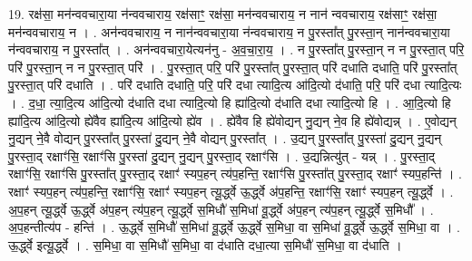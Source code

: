 \documentclass[17pt]{extarticle}
\begin{document}
19. रक्ष॑सा॒ मन॑न्ववचारा॒या न॑न्ववचाराय॒ रक्ष॑साꣳ॒॒ रक्ष॑सा॒ मन॑न्ववचाराय॒ न नान॑ न्ववचाराय॒ रक्ष॑साꣳ॒॒ रक्ष॑सा॒ मन॑न्ववचाराय॒ न । . अन॑न्ववचाराय॒ न नान॑न्ववचारा॒या न॑न्ववचाराय॒ न पु॒रस्ता᳚त् पु॒रस्ता॒न् नान॑न्ववचारा॒या न॑न्ववचाराय॒ न पु॒रस्ता᳚त् । . अन॑न्ववचारा॒येत्यन॑नु - अ॒व॒चा॒रा॒य॒ । . न पु॒रस्ता᳚त् पु॒रस्ता॒न् न न पु॒रस्ता॒त् परि॒ परि॑ पु॒रस्ता॒न् न न पु॒रस्ता॒त् परि॑ । . पु॒रस्ता॒त् परि॒ परि॑ पु॒रस्ता᳚त् पु॒रस्ता॒त् परि॑ दधाति दधाति॒ परि॑ पु॒रस्ता᳚त् पु॒रस्ता॒त् परि॑ दधाति । . परि॑ दधाति दधाति॒ परि॒ परि॑ दधा त्यादि॒त्य आ॑दि॒त्यो द॑धाति॒ परि॒ परि॑ दधा त्यादि॒त्यः । . द॒धा॒ त्या॒दि॒त्य आ॑दि॒त्यो द॑धाति दधा त्यादि॒त्यो हि ह्या॑दि॒त्यो द॑धाति दधा त्यादि॒त्यो हि । . आ॒दि॒त्यो हि ह्या॑दि॒त्य आ॑दि॒त्यो ह्ये॑वैव ह्या॑दि॒त्य आ॑दि॒त्यो ह्ये॑व । . ह्ये॑वैव हि ह्ये॑वोद्यन् नु॒द्यन् ने॒व हि ह्ये॑वोद्यन्न् । . ए॒वोद्यन् नु॒द्यन् ने॒वै वोद्यन् पु॒रस्ता᳚त् पु॒रस्ता॑ दु॒द्यन् ने॒वै वोद्यन् पु॒रस्ता᳚त् । . उ॒द्यन् पु॒रस्ता᳚त् पु॒रस्ता॑ दु॒द्यन् नु॒द्यन् पु॒रस्ता॒द् रक्षाꣳ॑सि॒ रक्षाꣳ॑सि पु॒रस्ता॑ दु॒द्यन् नु॒द्यन् पु॒रस्ता॒द् रक्षाꣳ॑सि । . उ॒द्यन्नित्यु॑त् - यन्न् । . पु॒रस्ता॒द् रक्षाꣳ॑सि॒ रक्षाꣳ॑सि पु॒रस्ता᳚त् पु॒रस्ता॒द् रक्षाꣳ॑ स्यप॒हन् त्य॑प॒हन्ति॒ रक्षाꣳ॑सि पु॒रस्ता᳚त् पु॒रस्ता॒द् रक्षाꣳ॑ स्यप॒हन्ति॑ । . रक्षाꣳ॑ स्यप॒हन् त्य॑प॒हन्ति॒ रक्षाꣳ॑सि॒ रक्षाꣳ॑ स्यप॒हन् त्यू॒र्द्ध्वे ऊ॒र्द्ध्वे अ॑प॒हन्ति॒ रक्षाꣳ॑सि॒ रक्षाꣳ॑ स्यप॒हन् त्यू॒र्द्ध्वे । . अ॒प॒हन् त्यू॒र्द्ध्वे ऊ॒र्द्ध्वे अ॑प॒हन् त्य॑प॒हन् त्यू॒र्द्ध्वे स॒मिधौ॑ स॒मिधा॑ वू॒र्द्ध्वे अ॑प॒हन् त्य॑प॒हन् त्यू॒र्द्ध्वे स॒मिधौ᳚ । . अ॒प॒हन्तीत्य॑प - हन्ति॑ । . ऊ॒र्द्ध्वे स॒मिधौ॑ स॒मिधा॑ वू॒र्द्ध्वे ऊ॒र्द्ध्वे स॒मिधा॒ वा स॒मिधा॑ वू॒र्द्ध्वे ऊ॒र्द्ध्वे स॒मिधा॒ वा । . ऊ॒र्द्ध्वे इत्यू॒र्द्ध्वे । . स॒मिधा॒ वा स॒मिधौ॑ स॒मिधा॒ वा द॑धाति दधा॒त्या स॒मिधौ॑ स॒मिधा॒ वा द॑धाति । \newline
\end{document}
